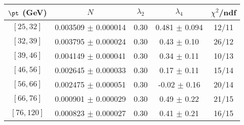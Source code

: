 \begin{tabular}{c||c|c|c|c}
$\pt$ (GeV) & $N$ & $\lambda_{2}$ & $\lambda_4$  & $\chi^2$/ndf  \\
\hline
$[25, 32]$ & 0.003509 $\pm$ 0.000014 & 0.30 & 0.481 $\pm$ 0.094 & 12/11\\
$[32, 39]$ & 0.003795 $\pm$ 0.000024 & 0.30 & 0.43 $\pm$ 0.10 & 26/12\\
$[39, 46]$ & 0.004149 $\pm$ 0.000041 & 0.30 & 0.34 $\pm$ 0.11 & 10/13\\
$[46, 56]$ & 0.002645 $\pm$ 0.000033 & 0.30 & 0.17 $\pm$ 0.11 & 15/14\\
$[56, 66]$ & 0.002475 $\pm$ 0.000051 & 0.30 & -0.02 $\pm$ 0.16 & 20/14\\
$[66, 76]$ & 0.000901 $\pm$ 0.000029 & 0.30 & 0.49 $\pm$ 0.22 & 21/15\\
$[76, 120]$ & 0.000823 $\pm$ 0.000027 & 0.30 & 0.41 $\pm$ 0.21 & 16/15\\
\end{tabular}
